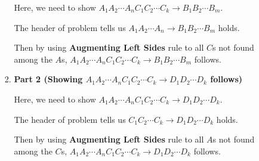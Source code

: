 \documentclass[12pt]{article}
\begin{document}
\begin{enumerate}[1.]
\begin{enumerate}[a)]
\begin{enumerate}[1.]
                \bigskip

                Here, we need to show $A_1A_2 \cdots A_n C_1 C_2 \cdots C_k \to B_1 B_2 \cdots B_m$.

                \bigskip

                The header of problem tells us $A_1A_2 \cdots A_n \to B_1 B_2 \cdots B_m$ holds.

                \bigskip

                Then by using \textbf{Augmenting Left Sides} rule to all $C$s not
                found among the $A$s, $A_1A_2 \cdots A_n C_1 C_2 \cdots C_k \to B_1 B_2 \cdots B_m$ follows.

                \bigskip

                \item \textbf{Part 2 (Showing $A_1A_2 \cdots A_n C_1 C_2 \cdots C_k \to D_1 D_2 \cdots D_k$ follows)}

                \bigskip

                Here, we need to show $A_1A_2 \cdots A_n C_1 C_2 \cdots C_k \to D_1 D_2 \cdots D_k$.

                \bigskip

                The header of problem tells us $C_1 C_2 \cdots C_k \to D_1 D_2 \cdots D_k$ holds.

                \bigskip

                Then by using \textbf{Augmenting Left Sides} rule to all $A$s not
                found among the $C$s, $A_1A_2 \cdots A_n C_1 C_2 \cdots C_k \to D_1 D_2 \cdots D_k$ follows.

            \end{enumerate}

            \bigskip









\end{enumerate}
\end{enumerate}
\end{document}
